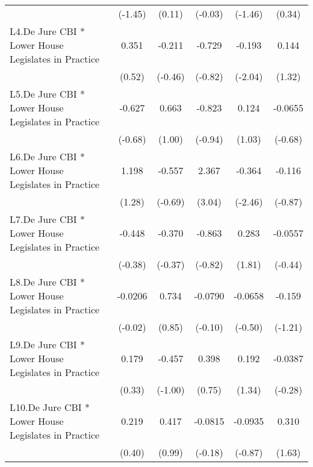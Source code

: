 {\begin{longtable}{l*{5}{c}}
                &  (-1.45)         &   (0.11)         &  (-0.03)         &  (-1.46)         &   (0.34)         \\
[1em]
L4.De Jure CBI * Lower House Legislates in Practice&    0.351         &   -0.211         &   -0.729         &   -0.193\sym{*}  &    0.144         \\
                &   (0.52)         &  (-0.46)         &  (-0.82)         &  (-2.04)         &   (1.32)         \\
[1em]
L5.De Jure CBI * Lower House Legislates in Practice&   -0.627         &    0.663         &   -0.823         &    0.124         &  -0.0655         \\
                &  (-0.68)         &   (1.00)         &  (-0.94)         &   (1.03)         &  (-0.68)         \\
[1em]
L6.De Jure CBI * Lower House Legislates in Practice&    1.198         &   -0.557         &    2.367\sym{**} &   -0.364\sym{*}  &   -0.116         \\
                &   (1.28)         &  (-0.69)         &   (3.04)         &  (-2.46)         &  (-0.87)         \\
[1em]
L7.De Jure CBI * Lower House Legislates in Practice&   -0.448         &   -0.370         &   -0.863         &    0.283         &  -0.0557         \\
                &  (-0.38)         &  (-0.37)         &  (-0.82)         &   (1.81)         &  (-0.44)         \\
[1em]
L8.De Jure CBI * Lower House Legislates in Practice&  -0.0206         &    0.734         &  -0.0790         &  -0.0658         &   -0.159         \\
                &  (-0.02)         &   (0.85)         &  (-0.10)         &  (-0.50)         &  (-1.21)         \\
[1em]
L9.De Jure CBI * Lower House Legislates in Practice&    0.179         &   -0.457         &    0.398         &    0.192         &  -0.0387         \\
                &   (0.33)         &  (-1.00)         &   (0.75)         &   (1.34)         &  (-0.28)         \\
[1em]
L10.De Jure CBI * Lower House Legislates in Practice&    0.219         &    0.417         &  -0.0815         &  -0.0935         &    0.310         \\
                &   (0.40)         &   (0.99)         &  (-0.18)         &  (-0.87)         &   (1.63)         \\
[1em]

\end{longtable}}

